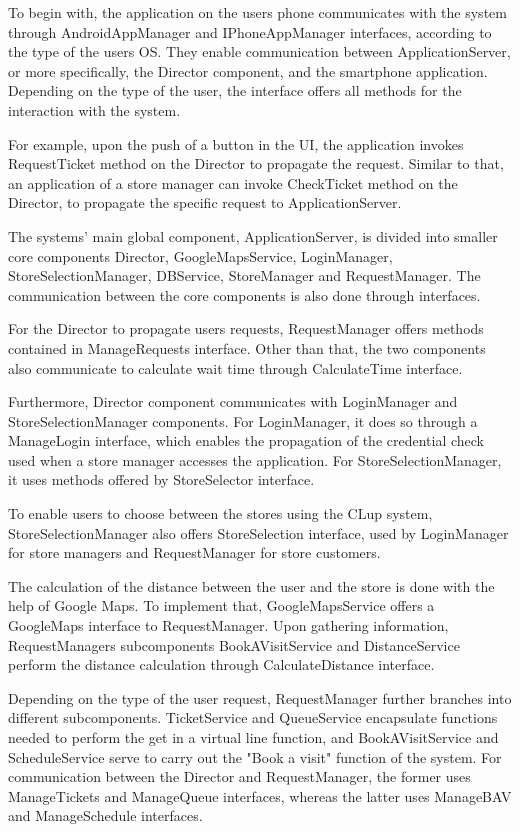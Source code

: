 To begin with, the application on the users phone communicates with the system through AndroidAppManager and IPhoneAppManager interfaces, according to the type of the users OS. They enable communication between ApplicationServer, or more specifically, the Director component, and the smartphone application. Depending on the type of the user, the interface offers all methods for the interaction with the system. 

For example, upon the push of a button in the UI, the application invokes RequestTicket method on the Director to propagate the request. Similar to that, an application of a store manager can invoke CheckTicket method on the Director, to propagate the specific request to ApplicationServer. \newline
 

The systems' main global component, ApplicationServer, is divided into smaller core components Director, GoogleMapsService, LoginManager, StoreSelectionManager, DBService, StoreManager and RequestManager. The communication between the core components is also done through interfaces. 

For the Director to propagate users requests, RequestManager offers methods contained in ManageRequests interface. Other than that, the two components also communicate to calculate wait time through CalculateTime interface. 

Furthermore, Director component communicates with LoginManager and StoreSelectionManager components. For LoginManager, it does so through a ManageLogin interface, which enables the propagation of the credential check used when a store manager accesses the application. For StoreSelectionManager, it uses methods offered by StoreSelector interface. \newline

To enable users to choose between the stores using the CLup system, StoreSelectionManager also offers StoreSelection interface, used by LoginManager for store managers and RequestManager for store customers. 

The calculation of the distance between the user and the store is done with the help of Google Maps. To implement that, GoogleMapsService offers a GoogleMaps interface to RequestManager. Upon gathering information, RequestManagers subcomponents BookAVisitService and DistanceService perform the distance calculation through CalculateDistance interface. \newline

Depending on the type of the user request, RequestManager further branches into different subcomponents. TicketService and QueueService encapsulate functions needed to perform the get in a virtual line function, and BookAVisitService and ScheduleService serve to carry out the "Book a visit" function of the system. For communication between the Director and RequestManager, the former uses ManageTickets and ManageQueue interfaces, whereas the latter uses ManageBAV and ManageSchedule interfaces. \newline

